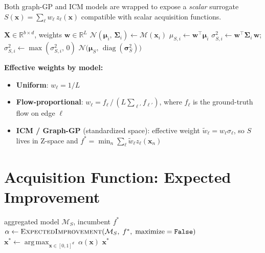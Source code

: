 \documentclass[11pt]{article}
\begin{document}
Both graph-GP and ICM models are wrapped to expose a \emph{scalar} surrogate
$S(\mathbf{x}) = \sum_\ell w_\ell\, z_\ell(\mathbf{x})$ compatible with
scalar acquisition functions.

\begin{algorithm}[H]
\caption{\textsc{LinearAggregation.posterior}($\mathbf{X}$)}
\begin{algorithmic}[1]
\Require $\mathbf{X} \in \mathbb{R}^{b\times d}$, weights $\mathbf{w} \in \mathbb{R}^L$
    \State $\mathcal{N}(\bm{\mu}_i,\,\bm{\Sigma}_i) \gets \mathcal{M}(\mathbf{x}_i)$
    \State $\mu_{S,i} \gets \mathbf{w}^\top \bm{\mu}_i$
    \State $\sigma^2_{S,i} \gets \mathbf{w}^\top \bm{\Sigma}_i\, \mathbf{w}$;\quad
           $\sigma^2_{S,i} \gets \max(\sigma^2_{S,i},\, 0)$
\EndFor
\State \Return $\mathcal{N}\!\bigl(\bm{\mu}_S,\, \operatorname{diag}(\bm{\sigma}^2_S)\bigr)$
\end{algorithmic}
\end{algorithm}

\noindent\textbf{Effective weights by model:}
\begin{itemize}
\item \textbf{Uniform}: $w_\ell = 1/L$
\item \textbf{Flow-proportional}: $w_\ell = f_\ell \,/\, (L \sum_{\ell'} f_{\ell'})$, where $f_\ell$ is the ground-truth flow on edge $\ell$
\item \textbf{ICM / Graph-GP} (standardized space): effective weight $\tilde{w}_\ell = w_\ell \sigma_\ell$, so $S$ lives in Z-space and $f^* = \min_n \sum_\ell \tilde{w}_\ell z_\ell(\mathbf{x}_n)$
\end{itemize}

\section{Acquisition Function: Expected Improvement}

\begin{algorithm}[H]
\caption{\textsc{OptimizeEI}}
\begin{algorithmic}[1]
\Require aggregated model $\mathcal{M}_S$, incumbent $f^*$
\State $\alpha \gets \textsc{ExpectedImprovement}(\mathcal{M}_S,\; f^*,\; \text{maximize}=\texttt{False})$
\State $\mathbf{x}^* \gets \operatorname*{arg\,max}_{\mathbf{x} \in [0,1]^d}\ \alpha(\mathbf{x})$
\State \Return $\mathbf{x}^*$
\end{algorithmic}
\end{algorithm}
\end{document}
